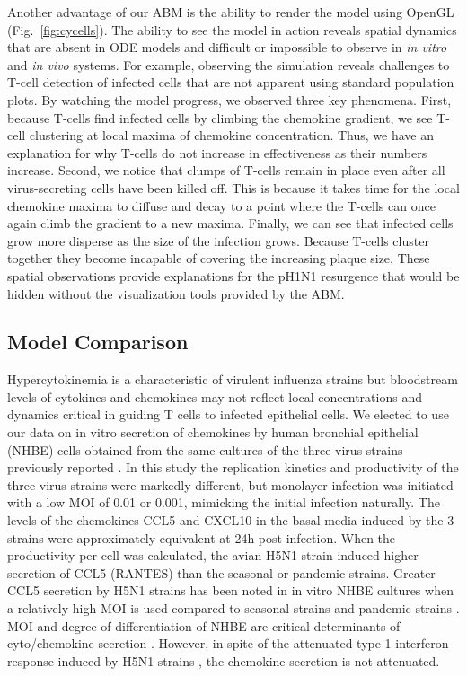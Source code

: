 \documentclass[10pt]{article}
\begin{document}
Another advantage of our ABM is the ability to render the model using OpenGL (Fig.~\ref{fig:cycells}).  The ability to see the model in action reveals spatial dynamics that are absent in ODE models and difficult or impossible to observe in \textit{in vitro} and \textit{in vivo} systems.  For example, observing the simulation reveals challenges to T-cell detection of infected cells that are not apparent using standard population plots.  By watching the model progress, we observed three key phenomena.  First, because T-cells find infected cells by climbing the chemokine gradient, we see T-cell clustering at local maxima of chemokine concentration.  Thus, we have an explanation for why T-cells do not increase in effectiveness as their numbers increase.  Second, we notice that clumps of T-cells remain in place even after all virus-secreting cells have been killed off.  This is because it takes time for the local chemokine maxima to diffuse and decay to a point where the T-cells can once again climb the gradient to a new maxima.  Finally, we can see that infected cells grow more disperse as the size of the infection grows.  Because T-cells cluster together they become incapable of covering the increasing plaque size.  These spatial observations provide explanations for the pH1N1 resurgence that would be hidden without the visualization tools provided by the ABM.


\subsection*{Model Comparison}

Hypercytokinemia is a characteristic of virulent influenza strains \cite{DeJong2006} but bloodstream levels of cytokines and chemokines may not reflect local concentrations and dynamics critical in guiding T cells to infected epithelial cells.  We elected to use our data on in vitro secretion of chemokines by human bronchial epithelial (NHBE) cells obtained from the same cultures of the three virus strains previously reported \cite{Mitchell2011}.  In this study the replication kinetics and productivity of the three virus strains were markedly different, but monolayer infection was initiated with a low MOI of 0.01 or 0.001, mimicking the initial infection naturally.  The levels of the chemokines CCL5 and CXCL10 in the basal media induced by the 3 strains were approximately equivalent at 24h post-infection.  When the productivity per cell was calculated, the avian H5N1 strain induced higher secretion of CCL5 (RANTES) than the seasonal or pandemic strains.  Greater CCL5 secretion by H5N1 strains has been noted in in vitro NHBE cultures when a relatively high MOI is used compared to seasonal strains \cite{Chan2005, Chan2010, Zeng2011} and pandemic strains \cite{Zeng2011}.  MOI and degree of differentiation of NHBE are critical determinants of cyto/chemokine secretion \cite{Chan2010}.  However, in spite of the attenuated type 1 interferon response induced by H5N1 strains \cite{Zeng2007}, the chemokine secretion is not attenuated.
\end{document}
